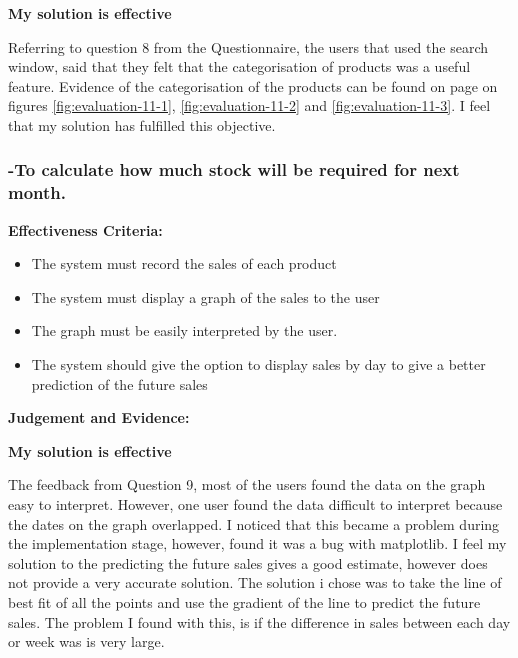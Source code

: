 \textbf{\large{My solution is effective}}

Referring to question 8 from the Questionnaire, the users that used the search window, said that they felt that the categorisation of products was a useful feature. Evidence of the categorisation of the products can be found on page \pageref{category-evidence} on figures \ref{fig:evaluation-11-1}, \ref{fig:evaluation-11-2} and \ref{fig:evaluation-11-3}. I feel that my solution has fulfilled this objective. 







\pagebreak
\subsubsection{-To calculate how much stock will be required for next month.}

\textbf{Effectiveness Criteria:}\newline
\begin{itemize}
	\item{The system must record the sales of each product}
	\item{The system must display a graph of the sales to the user}
	\item{The graph must be easily interpreted by the user.}
	\item{The system should give the option to display sales by day to give a better prediction of the future sales}
\end{itemize}

\textbf{Judgement and Evidence:} \newline

\textbf{\large{My solution is effective}}

The feedback from Question 9, most of the users found the data on the graph easy to interpret. However, one user found the data difficult to interpret because the dates on the graph overlapped. I noticed that this became a problem during the implementation stage, however, found it was a bug with matplotlib. I feel my solution to the predicting the future sales gives a good estimate, however does not provide a very accurate solution. The solution i chose was to take the line of best fit of all the points and use the gradient of the line to predict the future sales. The problem I found with this, is if the difference in sales between each day or week was is very large.







